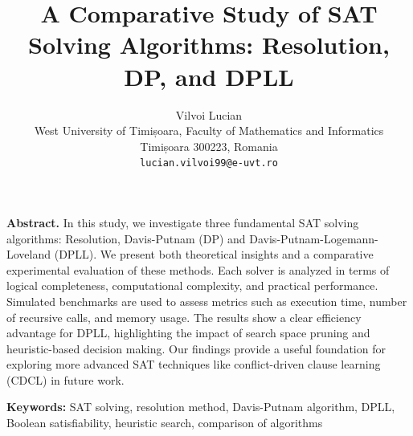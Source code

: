 \documentclass{article}
\title{A Comparative Study of SAT Solving Algorithms: Resolution, DP, and DPLL}
\author{
Vilvoi Lucian \\ [0.8em]
West University of Timișoara, Faculty of Mathematics and Informatics \\
Timișoara 300223, Romania \\
\texttt{lucian.vilvoi99@e-uvt.ro}
}
\date{}
\begin{document}
\maketitle

\maketitle

\noindent\textbf{Abstract.}
In this study, we investigate three fundamental SAT solving algorithms: Resolution, Davis-Putnam (DP) and Davis-Putnam-Logemann-Loveland (DPLL). We present both theoretical insights and a comparative experimental evaluation of these methods. Each solver is analyzed in terms of logical completeness, computational complexity, and practical performance. Simulated benchmarks are used to assess metrics such as execution time, number of recursive calls, and memory usage. The results show a clear efficiency advantage for DPLL, highlighting the impact of search space pruning and heuristic-based decision making. Our findings provide a useful foundation for exploring more advanced SAT techniques like conflict-driven clause learning (CDCL) in future work.

\vspace{1em}
\noindent\textbf{Keywords:} SAT solving, resolution method, Davis-Putnam algorithm, DPLL, Boolean satisfiability, heuristic search, comparison of algorithms
\end{document}
